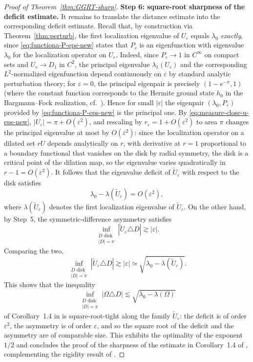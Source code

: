 \documentclass[a4paper,11pt,reqno]{amsart}
\numberwithin{equation}{section}
\theoremstyle{plain} %
\theoremstyle{definition} %
\theoremstyle{remark}
\begin{document}
\begin{proof}[Proof of Theorem~\ref{thm:GGRT-sharp}]
\medskip
\noindent
{\bf Step 6: square-root sharpness of the deficit estimate.} It remains to translate the distance estimate into the corresponding deficit
estimate. Recall that, by construction via Theorem~\ref{thm:perturb}, the
first localization eigenvalue of \(U_\varepsilon\) equals \(\lambda_0\)
\emph{exactly}, since \eqref{eq:functiona-P-eps-new} states that
\(P_\varepsilon\) is an eigenfunction with eigenvalue \(\lambda_0\) for the
localization operator on \(U_\varepsilon\). Indeed, since
\(P_\varepsilon\to 1\) in \(C^\infty\) on compact sets and \(U_\varepsilon\to D_1\)
in $C^2$, the principal eigenvalue \(\lambda_1(U_\varepsilon)\) and the
corresponding $L^2$-normalized eigenfunction depend continuously on
\(\varepsilon\) by standard analytic perturbation theory; for \(\varepsilon=0\),
the principal eigenpair is precisely \((1-e^{-\pi},1)\) (where the constant
function corresponds to the Hermite ground state $h_0$ in the Bargmann--Fock
realization, cf.~\cite{Daubechies}). Hence for small \(|\varepsilon|\) the
eigenpair \((\lambda_0,P_\varepsilon)\) provided by \eqref{eq:functiona-P-eps-new}
is the principal one. By
\eqref{eq:measure-close-u-eps-new},
\(|U_\varepsilon|=\pi+O(\varepsilon^2)\), and rescaling by
\(r_\varepsilon=1+O(\varepsilon^2)\) to area \(\pi\) changes the principal
eigenvalue at most by \(O(\varepsilon^2)\): since the localization operator
on a dilated set $rU$ depends analytically on $r$, with derivative at $r=1$
proportional to a boundary functional that vanishes on the disk by radial
symmetry, the disk is a critical point of the dilation map, so the
eigenvalue varies quadratically in \(r-1=O(\varepsilon^2)\). It follows that the eigenvalue deficit of
\(\widetilde U_\varepsilon\) with respect to the disk satisfies
\[
\lambda_0-\lambda(\widetilde U_\varepsilon)=O(\varepsilon^2),
\]
where \(\lambda(\widetilde U_\varepsilon)\) denotes the first localization
eigenvalue of \(\widetilde U_\varepsilon\). On the other hand, by Step~5,
the symmetric-difference asymmetry satisfies
\[
\inf_{\substack{D\text{ disk}\\ |D|=\pi}}|\widetilde U_\varepsilon\triangle D|
\gtrsim |\varepsilon|.
\]
Comparing the two,
\[
\inf_{\substack{D\text{ disk}\\ |D|=\pi}}|\widetilde U_\varepsilon\triangle D|
\gtrsim |\varepsilon|
\simeq
\sqrt{\lambda_0-\lambda(\widetilde U_\varepsilon)}.
\]
This shows that the inequality
\[
\inf_{\substack{D\text{ disk}\\ |D|=\pi}}
|\Omega\triangle D|
\lesssim
\sqrt{\lambda_0-\lambda(\Omega)}
\]
of Corollary~1.4 in \cite{Gomez-Guerra-Ramos-Tilli} is square-root-tight along
the family \(\widetilde U_\varepsilon\): the deficit is of order
\(\varepsilon^2\), the asymmetry is of order \(\varepsilon\), and so the
square root of the deficit and the asymmetry are of comparable size. This
exhibits the optimality of the exponent \(1/2\) and concludes the proof of the
sharpness of the estimate in Corollary~1.4 of
\cite{Gomez-Guerra-Ramos-Tilli}, complementing the rigidity result of
\cite{Nicola-Tilli}.

\end{proof}
\end{document}
